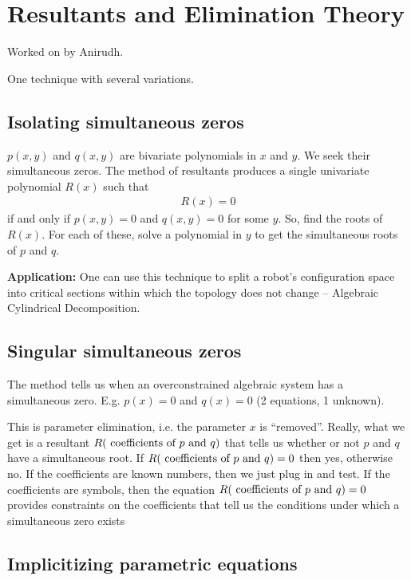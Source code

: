 \chapter{Resultants and Elimination Theory}


Worked on by Anirudh.

One technique with several variations.

\section{Isolating simultaneous zeros}

$p(x, y)$ and $q(x, y)$ are bivariate polynomials in $x$ and $y$. We
seek their simultaneous zeros. The method of resultants produces a
single univariate polynomial $R(x)$ such that
\begin{align*}
  R(x) = 0
\end{align*}
if and only if $p(x, y) = 0$ and $q(x, y) = 0$ for some $y$. So, find
the roots of $R(x)$. For each of these, solve a polynomial in $y$ to
get the simultaneous roots of $p$ and $q$.

\textbf{Application:} One can use this technique to split a robot's
configuration space into critical sections within which the topology
does not change -- Algebraic Cylindrical Decomposition.

\section{Singular simultaneous zeros}

The method tells us when an overconstrained algebraic system has a
simultaneous zero. E.g. $p(x) = 0$ and $q(x) = 0$ (2 equations, 1
unknown).


This is parameter elimination, i.e. the parameter $x$ is
``removed''. Really, what we get is a resultant $R(~\text{coefficients of}
~p~\text{and}~q)$ that tells us whether or not $p$ and $q$ have a
simultaneous root. If $R(~\text{coefficients of}~p~\text{and}~q)= 0$ then yes,
otherwise no. If the coefficients are known numbers, then we just plug
in and test. If the coefficients are symbols, then the equation
$R(~\text{coefficients of}~p~\text{and}~q) = 0$ provides constraints on the coefficients that
tell us the conditions under which a simultaneous zero exists

\section{Implicitizing parametric equations}

